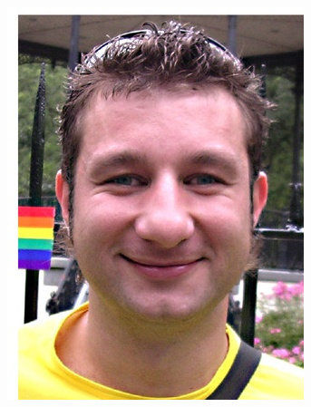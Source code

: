 \begin{figure}[htp]
\begin{subfigure}{0.2\linewidth}
		\caption{}
		\label{fig:1c}
	\end{subfigure}
	\newline
	\begin{subfigure}{0.2\linewidth}
		\includegraphics[width=\linewidth]{imagenes/dataset1-4.jpg} 
		\caption{}
		\label{fig:1d}
	\end{subfigure}\hfill
	\begin{subfigure}{0.2\linewidth}

\end{subfigure}
\end{figure}
